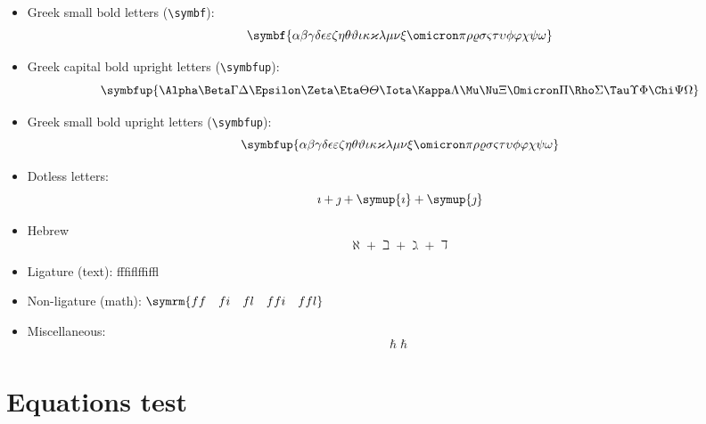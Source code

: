 \documentclass{article}
\def\Greekalphabets{%
  \Alpha      \Beta       \Gamma      \Delta      \Epsilon
  \Zeta       \Eta        \Theta      \varTheta   \Iota
  \Kappa      \Lambda     \Mu         \Nu         \Xi
  \Omicron    \Pi         \Rho        \Sigma      \Tau
  \Upsilon    \Phi        \Chi        \Psi        \Omega
}
\def\greekalphabets{%
  \alpha      \beta       \gamma      \delta      \epsilon
  \varepsilon \zeta       \eta        \theta      \vartheta 
  \iota       \kappa      \varkappa   \lambda     \mu
  \nu         \xi         \omicron    \pi         \rho
  \varrho     \sigma      \varsigma   \tau        \upsilon
  \phi        \varphi     \chi        \psi        \omega
}
\def\ligaturetext{ff\quad fi\quad fl\quad ffi\quad ffl}
\begin{document}
\begin{itemize}
  \item Greek small bold letters (\verb|\symbf|):
        \[ \symbf{\greekalphabets} \]

  \item Greek capital bold upright letters (\verb|\symbfup|):
        \[ \symbfup{\Greekalphabets} \]

  \item Greek small bold upright letters (\verb|\symbfup|):
        \[ \symbfup{\greekalphabets} \]

  \item Dotless letters:
        \[ \imath + \jmath + \symup{\imath} + \symup{\jmath} \]
  \item Hebrew
        \[ \aleph + \beth + \gimel + \daleth \]

  \item Ligature (text): {\firatext\ligaturetext}

  \item Non-ligature (math): $ \symrm{\ligaturetext} $

  \item Miscellaneous:
        \[ \hbar \hslash \]

\end{itemize}

\section{Equations test}
\end{document}
